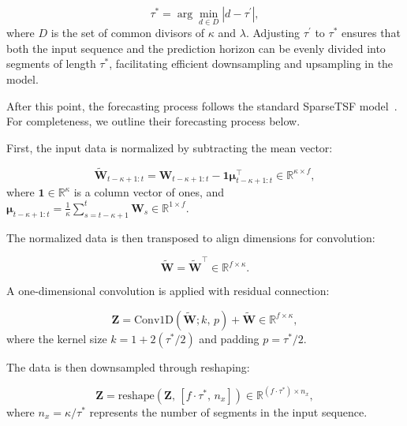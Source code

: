 \documentclass{ieeetmlcn}
\begin{document}
\begin{equation}
\label{eq:tau_adjust}
\tau^{\ast} = \arg\min_{d \in D} \left| d - \tau^\prime \right|,
\end{equation}
where $D$ is the set of common divisors of $\kappa$ and $\lambda$. Adjusting $\tau^\prime$ to $\tau^{\ast}$ ensures that both the input sequence and the prediction horizon can be evenly divided into segments of length $\tau^{\ast}$, facilitating efficient downsampling and upsampling in the model.

After this point, the forecasting process follows the standard SparseTSF model~\cite{sparseTSF}. For completeness, we outline their forecasting process below.

First, the input data is normalized by subtracting the mean vector:

\begin{equation}
\label{eq:normalization}
\tilde{\mathbf{W}}_{t-\kappa+1:t} = \mathbf{W}_{t-\kappa+1:t} - \mathbf{1} \boldsymbol{\mu}_{t-\kappa+1:t}^\top \in \mathbb{R}^{\kappa \times f},
\end{equation}
where $\mathbf{1} \in \mathbb{R}^{\kappa}$ is a column vector of ones, and $\boldsymbol{\mu}_{t-\kappa+1:t} = \frac{1}{\kappa} \sum_{s=t-\kappa+1}^{t} \mathbf{W}_{s} \in \mathbb{R}^{1 \times f}$.

The normalized data is then transposed to align dimensions for convolution:

\begin{equation}
\label{eq:permutation}
\tilde{\mathbf{W}} = \tilde{\mathbf{W}}^\top \in \mathbb{R}^{f \times \kappa}.
\end{equation}

A one-dimensional convolution is applied with residual connection:

\begin{equation}
\label{eq:convolution}
\mathbf{Z} = \text{Conv1D}\left( \tilde{\mathbf{W}}; k,\, p \right) + \tilde{\mathbf{W}} \in \mathbb{R}^{f \times \kappa},
\end{equation}
where the kernel size $k = 1 + 2(\tau^{\ast}/2)$ and padding $p = \tau^{\ast}/2$.

The data is then downsampled through reshaping:

\begin{equation}
\label{eq:downsampling}
\mathbf{Z} = \text{reshape}\left( \mathbf{Z},\, \left[ f \cdot \tau^{\ast},\, n_x \right] \right) \in \mathbb{R}^{(f \cdot \tau^{\ast}) \times n_x},
\end{equation}
where $n_x = \kappa / \tau^{\ast}$ represents the number of segments in the input sequence.
\end{document}
